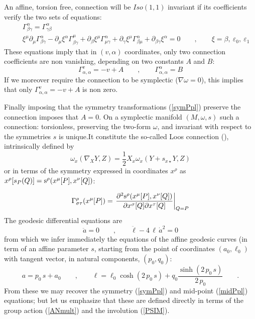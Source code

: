 \documentclass{article}
\begin{document}
An affine, torsion free, connection will be $Iso(1,1)$ invariant if its coefficients verify the two sets of equations:
\begin{eqnarray}
&&\Gamma^{\alpha}_{\beta\gamma}=\Gamma^{\alpha}_{\gamma\beta}\\
&&\xi^\mu \partial_\mu \Gamma^{\alpha}_{\beta\gamma}-\partial_{\mu}\xi ^\alpha \Gamma^{\mu}_{\beta\gamma}+\partial_{\beta}\xi ^\mu \Gamma^{\alpha}_{\mu\gamma}+\partial_{\gamma}\xi ^\mu \Gamma^{\alpha}_{\beta\mu}+\partial_{\beta\gamma}\xi ^\alpha=0\qquad,\qquad \xi=\beta,\ \varepsilon_0,\ \varepsilon_1
\end{eqnarray}
These equations imply that in $(v,\alpha)$ coordinates,  only two connection coefficients are non vanishing, depending  on two constants $A$ and $B$:
\begin{equation}
\Gamma^v_{\alpha,\alpha}= -v+A\qquad,\qquad\Gamma^\alpha_{\alpha,\alpha}=B 
\end{equation}
If we moreover require the connection to be symplectic ($\nabla \omega =0$), this implies that only $\Gamma^v_{\alpha,\alpha}= -v+A$ is non zero. 

Finally imposing that the symmetry transformations (\ref{symPpl}) preserve the connection imposes that $A=0$.
On a symplectic manifold $(M,\omega,s)$ such a connection: torsionless, preserving the two-form $\omega$, and invariant with respect to the symmetries $s$ is unique.It constitute the so-called Loos connection (\cite{Bithese}), intrinsically  defined by
\begin{equation}
\omega_x(\nabla_{X}Y,Z)=\frac 12 X_x\omega_x(Y+s_{x\star}Y,Z)
\end{equation}
or in terms of the symmetry expressed in coordinates $x^\rho$ as
$x^\rho[s_P(Q)]=\text{\rm s}^\rho(x^\mu[P],x^\nu[Q])$:

$$\Gamma^\rho_{\sigma\tau}(x^\mu[P])=\left.\frac{\partial^2\text{\rm s}^\rho(x^\mu[P],x^\nu[Q])}{\partial x^\sigma[Q]\partial x^\tau[Q]}\right\vert_{Q=P}
$$
The geodesic differential equations are
\begin{equation}\ddot a =0\qquad,\qquad \ddot\ell-4\,\ell\,{\dot a} ^2=0
\end{equation}
from which we infer immediately the equations of the affine geodesic curves (in term of an affine parameter $s$, starting from the point of coordinates $(a_0, \ell_0)$ with tangent vector, in natural components, $(p_0,q_0 )$:
\begin{equation}
 a =p_0\, s+ a_0\qquad,\qquad \ell =\ell_0\cosh (2\,p_0\, s) + q_0\frac{\sinh (2\,p_0\, s)}{2\,p_0}\qquad.
\end{equation}
From these we may recover the symmetry (\ref{symPpl}) and mid-point (\ref{midPpl}) equations; but let us emphasize that these are defined directly in terms  of the group action (\ref{ANmult}) and the involution (\ref{PSIM}).
 
\end{document}
